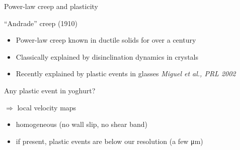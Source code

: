 \begin{frame}{Power-law creep and plasticity}
\begin{block}{``Andrade'' creep (1910)}
\begin{itemize}
\item Power-law creep known in \alert{ductile solids} for over a century
\item Classically explained by disinclination dynamics in crystals
\item Recently explained by plastic events in glasses \textit{\footnotesize Miguel et al., PRL 2002}
\end{itemize}
\end{block}

Any plastic event in yoghurt?

\bigskip
{} $\Rightarrow$ local velocity maps
\begin{itemize}
	\item homogeneous  (no wall slip, no shear band)
	\item if present, plastic events are below our resolution (a few \si{\micro\metre})
\end{itemize}
\end{frame}




